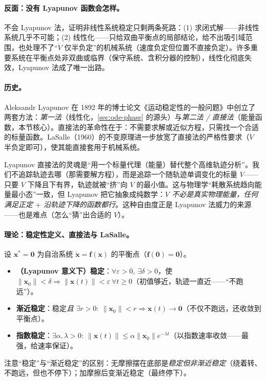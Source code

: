 \paragraph{反面：没有 Lyapunov 函数会怎样。}
不会 Lyapunov 法，证明非线性系统稳定只剩两条死路：(1) 求闭式解——非线性系统几乎不可能；(2) 线性化——只给双曲平衡点的局部结论，给不出吸引域范围，也处理不了“$\dot V$ 仅半负定”的机械系统（速度负定但位置不直接负定）。许多重要系统在平衡点处非双曲或临界（保守系统、含积分器的控制），线性化彻底失效，Lyapunov 法成了唯一出路。

\paragraph{历史。}
Aleksandr Lyapunov 在 1892 年的博士论文《运动稳定性的一般问题》中创立了两套方法：\emph{第一法}（线性化，\cref{sec:ode-phase} 的源头）与\emph{第二法 / 直接法}（能量函数，本节核心）。直接法的革命性在于：不需要求解或近似方程，只需找一个合适的标量函数。LaSalle（1960）的不变原理进一步放宽了直接法的严格性要求（$\dot V$ 半负定即可），使其能直接套用于机械系统\cite{khalil2002nonlinear}。

\begin{insight}[用一个标量代理替代整个高维轨迹分析]
Lyapunov 直接法的灵魂是“用一个标量代理（能量）替代整个高维轨迹分析”。我们不追踪轨迹去哪（那需要解方程），而是追踪一个随轨迹单调变化的标量 $V$——只要 $V$ 下降且下有界，轨迹就被“挤”向 $V$ 的最小值。这与物理学“耗散系统趋向能量最小态”一致，但 Lyapunov 把它抽象成纯数学：\emph{$V$ 不必是真实物理能量，任何满足正定 $+$ 沿轨迹下降的函数都行}。这种自由度正是 Lyapunov 法威力的来源——也是难点（怎么“猜”出合适的 $V$）。
\end{insight}

\paragraph{理论：稳定性定义、直接法与 LaSalle。}
设 $\mathbf{x}^*=\mathbf{0}$ 为自治系统 $\dot{\mathbf{x}}=\mathbf{f}(\mathbf{x})$ 的平衡点（$\mathbf{f}(\mathbf{0})=\mathbf{0}$）。

\begin{definition}\label{def:stability}
\begin{itemize}
  \item \textbf{（Lyapunov 意义下）稳定}：$\forall\varepsilon>0,\ \exists\delta>0$，使 $\|\mathbf{x}_0\|<\delta\Rightarrow\|\mathbf{x}(t)\|<\varepsilon\ \forall t\ge0$（初值够近，轨迹一直近——“不跑远”）。
  \item \textbf{渐近稳定}：稳定\emph{且} $\exists r>0:\ \|\mathbf{x}_0\|<r\Rightarrow\mathbf{x}(t)\to\mathbf{0}$（不仅不跑远，还收敛到平衡点）。
  \item \textbf{指数稳定}：$\exists\alpha,\lambda>0:\ \|\mathbf{x}(t)\|\le\alpha\|\mathbf{x}_0\|e^{-\lambda t}$（以指数速率收敛——最强，给速率保证）。
\end{itemize}
\end{definition}
\noindent 注意“稳定”与“渐近稳定”的区别：无摩擦摆在底部是\emph{稳定但非渐近稳定}（绕着转、不跑远，但也不停下）；加摩擦后变渐近稳定（最终停下）。

